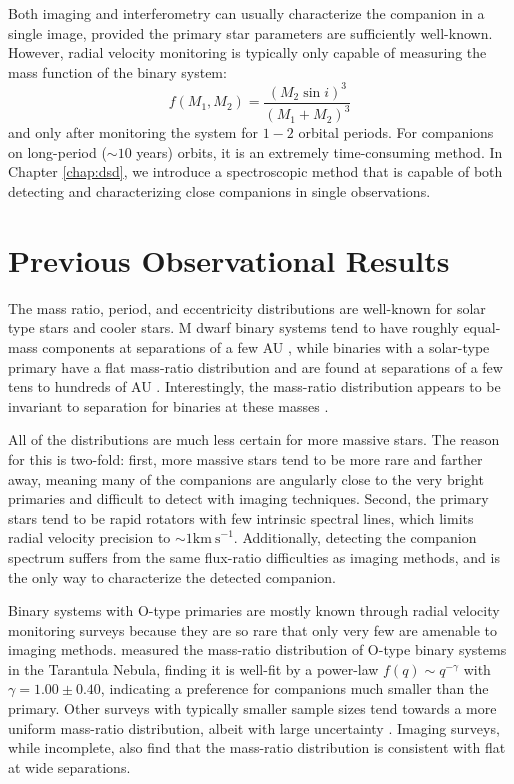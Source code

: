 \documentclass{utthesis}
\begin{document}
Both imaging and interferometry can usually characterize the companion in a single image, provided the primary star parameters are sufficiently well-known. However, radial velocity monitoring is typically only capable of measuring the mass function of the binary system:
\begin{equation}
 f(M_1, M_2) = \frac{(M_2\sin{i})^3}{(M_1+M_2)^3}
 \end{equation}
 and only after monitoring the system for $1-2$ orbital periods. For companions on long-period ($\sim 10$ years) orbits, it is an extremely time-consuming method. In Chapter \ref{chap:dsd}, we introduce a spectroscopic method that is capable of both detecting and characterizing close companions in single observations.


\section{Previous Observational Results}

The mass ratio, period, and eccentricity distributions are well-known for solar type stars and cooler stars. M dwarf binary systems tend to have roughly equal-mass components at separations of a few AU \citep{Fischer1992}, while binaries with a solar-type primary have a flat mass-ratio distribution and are found at separations of a few tens to hundreds of AU \citep{Raghavan2010}. Interestingly, the mass-ratio distribution appears to be invariant to separation for binaries at these masses \citep{Reggiani2011, Meyer2013}.

All of the distributions are much less certain for more massive stars. The reason for this is two-fold: first, more massive stars tend to be more rare and farther away, meaning many of the companions are angularly close to the very bright primaries and difficult to detect with imaging techniques. Second, the primary stars tend to be rapid rotators with few intrinsic spectral lines, which limits radial velocity precision to $\sim 1 \mathrm{km\ s}^{-1}$. Additionally, detecting the companion spectrum suffers from the same flux-ratio difficulties as imaging methods, and is the only way to characterize the detected companion.

Binary systems with O-type primaries are mostly known through radial velocity monitoring surveys because they are so rare that only very few are amenable to imaging methods. \citet{Sana2013} measured the mass-ratio distribution of O-type binary systems in the Tarantula Nebula, finding it is well-fit by a power-law $f(q) \sim q^{-\gamma}$ with $\gamma = 1.00 \pm 0.40$, indicating a preference for companions much smaller than the primary. Other surveys with typically smaller sample sizes tend towards a more uniform mass-ratio distribution, albeit with large uncertainty \citep{Sana2012, Kiminki2012}. Imaging surveys, while incomplete, also find that the mass-ratio distribution is consistent with flat \citep{Peter2012} at wide separations.
\end{document}
